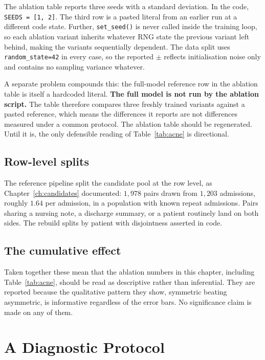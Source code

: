 The ablation table reports three seeds with a standard deviation. In the code,
\texttt{SEEDS = [1, 2]}. The third row is a pasted literal from an earlier run at
a different code state. Further, \texttt{set\_seed()} is never called inside the
training loop, so each ablation variant inherits whatever RNG state the previous
variant left behind, making the variants sequentially dependent. The data split
uses \texttt{random\_state=42} in every case, so the reported $\pm$ reflects
initialisation noise only and contains no sampling variance whatever.

A separate problem compounds this: the full-model reference row in the ablation
table is itself a hardcoded literal. \textbf{The full model is not run by the
ablation script.} The table therefore compares three freshly trained variants
against a pasted reference, which means the differences it reports are not
differences measured under a common protocol. The ablation table should be
regenerated. Until it is, the only defensible reading of
Table~\ref{tab:acne} is directional.

\subsection{Row-level splits}

The reference pipeline split the candidate pool at the row level, as
Chapter~\ref{ch:candidates} documented: $1{,}978$ pairs drawn from $1{,}203$
admissions, roughly $1.64$ per admission, in a population with known repeat
admissions. Pairs sharing a nursing note, a discharge summary, or a patient
routinely land on both sides. The rebuild splits by patient with disjointness
asserted in code.

\subsection{The cumulative effect}

Taken together these mean that the ablation numbers in this chapter,
including Table~\ref{tab:acne}, should be read as descriptive rather than
inferential. They are reported because the qualitative pattern they show,
symmetric beating asymmetric, is informative regardless of the error bars. No
significance claim is made on any of them.

\section{A Diagnostic Protocol}
\label{sec:diagnostics}

